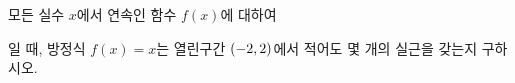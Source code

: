 모든 실수 $x$에서 연속인 함수 $f(x)$에 대하여 \par\smallskip{}\par\smallskip\noindent 일 때, 방정식 $f(x)=x$는 열린구간 $(-2{,}\mkern3mu\mathopen{}2)$에서 적어도 몇 개의 실근을 갖는지 구하시오.
